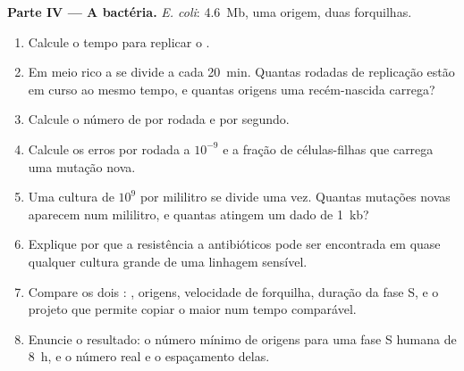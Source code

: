 \begin{problem}
\medskip
\noindent\textbf{Parte IV --- A bactéria.}
\emph{E. coli}: \qty{4.6}{Mb}, uma origem, duas forquilhas.
\begin{enumerate}[resume]
  \item Calcule o tempo para replicar o .
  \item Em meio rico a  se divide a cada \qty{20}{min}. Quantas
        rodadas de replicação estão em curso ao mesmo tempo, e quantas
        origens uma  recém-nascida carrega?
  \item Calcule o número de  por rodada e por
        segundo.
  \item Calcule os erros por rodada a $10^{-9}$ e a fração de
        células-filhas que carrega uma mutação nova.
  \item Uma cultura de $10^9$  por mililitro se divide uma vez.
        Quantas mutações novas aparecem num mililitro, e quantas atingem
        um dado  de \qty{1}{kb}?
  \item Explique por que a resistência a antibióticos pode ser
        encontrada em quase qualquer cultura grande de uma linhagem
        sensível.
  \item Compare os dois : , origens, velocidade
        de forquilha, duração da fase S, e o projeto que permite copiar
        o  maior num tempo comparável.
  \item Enuncie o resultado: o número mínimo de origens para uma fase S
        humana de \qty{8}{h}, e o número real e o espaçamento delas.
\end{enumerate}
\end{problem}
